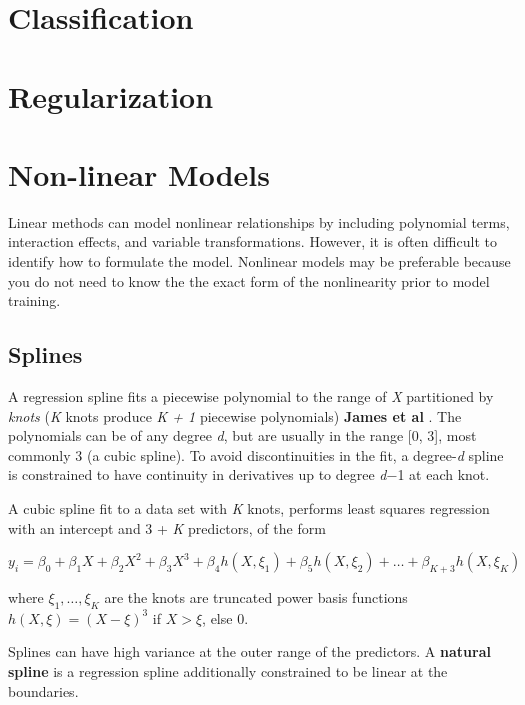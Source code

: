 \documentclass[]{book}
\begin{document}
\hypertarget{classification}{%
\chapter{Classification}\label{classification}}

\hypertarget{regularization}{%
\chapter{Regularization}\label{regularization}}

\hypertarget{non-linear-models}{%
\chapter{Non-linear Models}\label{non-linear-models}}

Linear methods can model nonlinear relationships by including polynomial terms, interaction effects, and variable transformations. However, it is often difficult to identify how to formulate the model. Nonlinear models may be preferable because you do not need to know the the exact form of the nonlinearity prior to model training.

\hypertarget{splines}{%
\section{Splines}\label{splines}}

A regression spline fits a piecewise polynomial to the range of \emph{X} partitioned by \emph{knots} (\emph{K} knots produce \emph{K + 1} piecewise polynomials) \textbf{James et al} \citep{James2013}. The polynomials can be of any degree \emph{d}, but are usually in the range {[}0, 3{]}, most commonly 3 (a cubic spline). To avoid discontinuities in the fit, a degree-\emph{d} spline is constrained to have continuity in derivatives up to degree \emph{d}−1 at each knot.

A cubic spline fit to a data set with \emph{K} knots, performs least squares regression with an intercept and 3 + \emph{K} predictors, of the form

\[y_i = \beta_0 + \beta_1X + \beta_2X^2 + \beta_3X^3 + \beta_4h(X, \xi_1) + \beta_5h(X, \xi_2) + \dots + \beta_{K+3}h(X, \xi_K)\]

where \(\xi_1, \dots, \xi_K\) are the knots are truncated power basis functions \(h(X, \xi) = (X - \xi)^3\) if \(X > \xi\), else 0.

Splines can have high variance at the outer range of the predictors. A \textbf{natural spline} is a regression spline additionally constrained to be linear at the boundaries.
\end{document}
